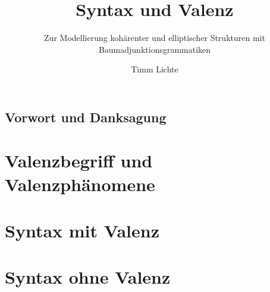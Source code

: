 \documentclass[ number=1
			   ,series=eotms
			   ,output=short    %
			   ,newtxmath
			   ,draftmode 
			  ]{LSP/langsci}
\title{Syntax \newlineCover und Valenz}
\subtitle{Zur Modellierung kohärenter und elliptischer Strukturen mit Baumadjunktionsgrammatiken}
\author{Timm Lichte}
\begin{document}
               
                                                                                                            
\maketitle

\frontmatter

\chapter*{Vorwort und Danksagung}
%
\tableofcontents

\mainmatter      
        


\part{Valenzbegriff und Valenzphänomene} 


    

\part{Syntax mit Valenz}


  
  

\part{Syntax ohne Valenz} 



  
  




                              
\end{document}
